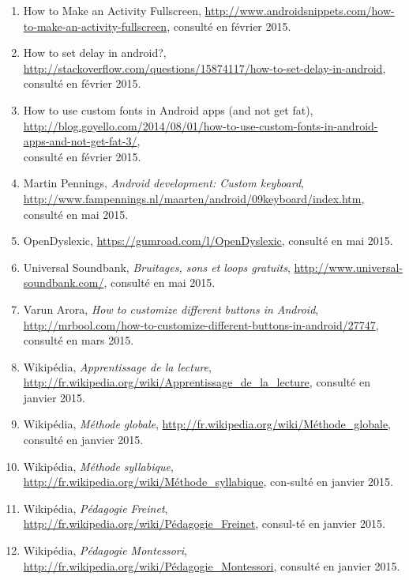 \begin{enumerate}
\item How to Make an Activity Fullscreen, \url{http://www.androidsnippets.com/how-to-make-an-activity-fullscreen}, consulté en février 2015.

\item How to set delay in android?, \url{http://stackoverflow.com/questions/15874117/how-to-set-delay-in-android}, consulté en février 2015.

\item How to use custom fonts in Android apps (and not get fat), \url{http://blog.goyello.com/2014/08/01/how-to-use-custom-fonts-in-android-apps-and-not-get-fat-3/}, \\consulté en février 2015.

\item Martin Pennings, \textit{Android development: Custom keyboard}, \url{http://www.fampennings.nl/maarten/android/09keyboard/index.htm}, consulté en mai 2015.

\item OpenDyslexic, \url{https://gumroad.com/l/OpenDyslexic}, consulté en mai 2015.

\item Universal Soundbank, \textit{Bruitages, sons et loops gratuits}, \url{http://www.universal-soundbank.com/}, consulté en mai 2015.

\item Varun Arora, \textit{How to customize different buttons in Android}, \url{http://mrbool.com/how-to-customize-different-buttons-in-android/27747}, consulté en mars 2015.

\item Wikipédia, \textit{Apprentissage de la lecture}, \url{http://fr.wikipedia.org/wiki/Apprentissage_de_la_lecture}, consulté en janvier 2015.

\item Wikipédia, \textit{Méthode globale}, \url{http://fr.wikipedia.org/wiki/Méthode_globale}, consulté en janvier 2015.

\item Wikipédia, \textit{Méthode syllabique}, \url{http://fr.wikipedia.org/wiki/Méthode_syllabique}, con-sulté en janvier 2015.

\item Wikipédia, \textit{Pédagogie Freinet}, \url{http://fr.wikipedia.org/wiki/Pédagogie_Freinet}, consul-té en janvier 2015.

\item Wikipédia, \textit{Pédagogie Montessori}, \url{http://fr.wikipedia.org/wiki/Pédagogie_Montessori}, consulté en janvier 2015.


\end{enumerate}

